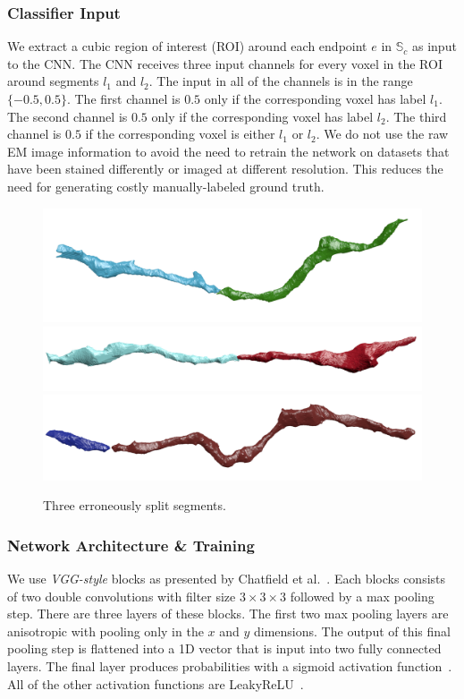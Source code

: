 \subsubsection{Classifier Input}

We extract a cubic region of interest (ROI) around each endpoint $e$ in $\mathbb{S}_c$ as input to the CNN. 
The CNN receives three input channels for every voxel in the ROI around segments $l_1$ and $l_2$. 
The input in all of the channels is in the range $\{-0.5, 0.5\}$. 
The first channel is $0.5$ only if the corresponding voxel has label $l_1$. 
The second channel is $0.5$ only if the corresponding voxel has label $l_2$. 
The third channel is $0.5$ if the corresponding voxel is either $l_1$ or $l_2$.
We do not use the raw EM image information to avoid the need to retrain the network on datasets that have been stained differently or imaged at different resolution. 
This reduces the need for generating costly manually-labeled ground truth. 

\begin{figure}[t]
	\centering
	\includegraphics[width=0.32\linewidth]{./figures/split_error1.png}
	\includegraphics[width=0.32\linewidth]{./figures/split_error2.png}		\includegraphics[width=0.32\linewidth]{./figures/merge_candidate2.png}
	\caption{Three erroneously split segments.}
	\label{fig:merge_candidates}
\end{figure}

\subsubsection{Network Architecture \& Training}

We use \textit{VGG-style} blocks as presented by Chatfield et al.~\cite{chatfield2014return}. 
Each blocks consists of two double convolutions with filter size $3\times3\times3$ followed by a max pooling step. 
There are three layers of these blocks. 
The first two max pooling layers are anisotropic with pooling only in the $x$ and $y$ dimensions. 
The output of this final pooling step is flattened into a 1D vector that is input into two fully connected layers. 
The final layer produces probabilities with a sigmoid activation function~\cite{funahashi1989approximate}. 
All of the other activation functions are LeakyReLU~\cite{maas2013rectifier}.

